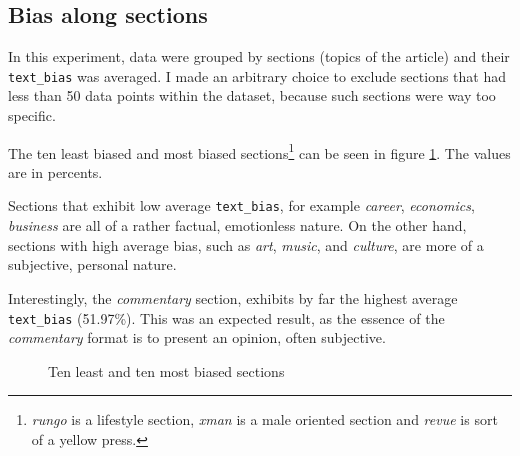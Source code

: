 \newpage
\subsection{Bias along sections}\label{commentary_bias}
In this experiment, data were grouped by sections (topics of the article) and their \verb|text_bias| was averaged. I made an arbitrary choice to exclude sections that had less than 50 data points within the dataset, because such sections were way too specific.

The ten least biased and most biased sections\footnote{\textit{rungo} is a lifestyle section, \textit{xman} is a male oriented section and \textit{revue} is sort of a yellow press.} can be seen in figure \ref{fig:sections}. The values are in percents.


Sections that exhibit low average \verb|text_bias|, for example \textit{career}, \textit{economics}, \textit{business} are all of a rather factual, emotionless nature.
On the other hand, sections with high average bias, such as \textit{art}, \textit{music}, and \textit{culture}, are more of a subjective, personal nature.

Interestingly, the \textit{commentary} section, exhibits by far the highest average \verb|text_bias| (51.97\%). This was an expected result, as the essence of the \textit{commentary} format is to present an opinion, often subjective.

%

\begin{figure}%
    \centering
    \qquad
    \caption{Ten least and ten most biased sections}%
    \label{fig:sections}%
\end{figure}



